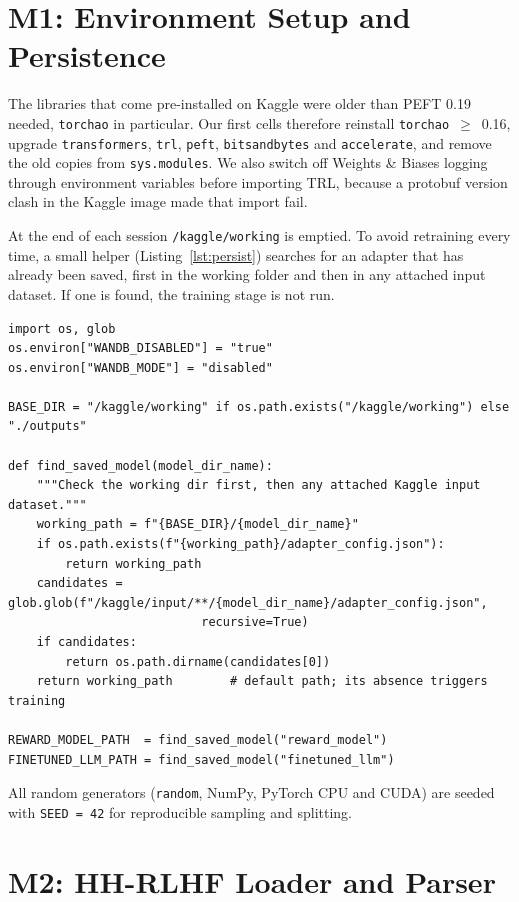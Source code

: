 \section{M1: Environment Setup and Persistence}
\label{sec:m1}

The libraries that come pre-installed on Kaggle were older than PEFT 0.19 needed, \texttt{torchao} in particular. Our first cells therefore reinstall \texttt{torchao}~$\ge$~0.16, upgrade \texttt{transformers}, \texttt{trl}, \texttt{peft}, \texttt{bitsandbytes} and \texttt{accelerate}, and remove the old copies from \texttt{sys.modules}. We also switch off Weights \& Biases logging through environment variables before importing TRL, because a protobuf version clash in the Kaggle image made that import fail.

At the end of each session \texttt{/kaggle/working} is emptied. To avoid retraining every time, a small helper (Listing~\ref{lst:persist}) searches for an adapter that has already been saved, first in the working folder and then in any attached input dataset. If one is found, the training stage is not run.

\begin{lstlisting}[caption={Locating previously saved adapters across Kaggle sessions.}, label={lst:persist}]
import os, glob
os.environ["WANDB_DISABLED"] = "true"
os.environ["WANDB_MODE"] = "disabled"

BASE_DIR = "/kaggle/working" if os.path.exists("/kaggle/working") else "./outputs"

def find_saved_model(model_dir_name):
    """Check the working dir first, then any attached Kaggle input dataset."""
    working_path = f"{BASE_DIR}/{model_dir_name}"
    if os.path.exists(f"{working_path}/adapter_config.json"):
        return working_path
    candidates = glob.glob(f"/kaggle/input/**/{model_dir_name}/adapter_config.json",
                           recursive=True)
    if candidates:
        return os.path.dirname(candidates[0])
    return working_path        # default path; its absence triggers training

REWARD_MODEL_PATH  = find_saved_model("reward_model")
FINETUNED_LLM_PATH = find_saved_model("finetuned_llm")
\end{lstlisting}

All random generators (\texttt{random}, NumPy, PyTorch CPU and CUDA) are seeded with \texttt{SEED = 42} for reproducible sampling and splitting.

\section{M2: HH-RLHF Loader and Parser}
\label{sec:m2}

